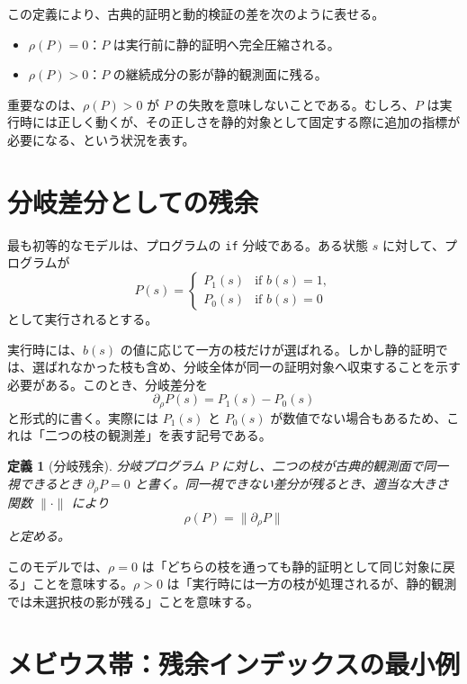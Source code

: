 \documentclass[11pt,a4paper,ja=standard,autodetect-engine]{bxjsarticle}
\newtheorem{definition}{定義}
\begin{document}
この定義により、古典的証明と動的検証の差を次のように表せる。
\begin{itemize}
    \item $\rho(P)=0$：$P$ は実行前に静的証明へ完全圧縮される。
    \item $\rho(P)>0$：$P$ の継続成分の影が静的観測面に残る。
\end{itemize}

重要なのは、$\rho(P)>0$ が $P$ の失敗を意味しないことである。むしろ、$P$ は実行時には正しく動くが、その正しさを静的対象として固定する際に追加の指標が必要になる、という状況を表す。

\section{分岐差分としての残余}

最も初等的なモデルは、プログラムの \texttt{if} 分岐である。ある状態 $s$ に対して、プログラムが
\begin{equation}
    P(s)=
    \begin{cases}
        P_{1}(s) & \text{if } b(s)=1,\\
        P_{0}(s) & \text{if } b(s)=0
    \end{cases}
\end{equation}
として実行されるとする。

実行時には、$b(s)$ の値に応じて一方の枝だけが選ばれる。しかし静的証明では、選ばれなかった枝も含め、分岐全体が同一の証明対象へ収束することを示す必要がある。このとき、分岐差分を
\begin{equation}
    \partial_{\rho}P(s)=P_{1}(s)-P_{0}(s)
\end{equation}
と形式的に書く。実際には $P_{1}(s)$ と $P_{0}(s)$ が数値でない場合もあるため、これは「二つの枝の観測差」を表す記号である。

\begin{definition}[分岐残余]
分岐プログラム $P$ に対し、二つの枝が古典的観測面で同一視できるとき $\partial_{\rho}P=0$ と書く。同一視できない差分が残るとき、適当な大きさ関数 $\|\cdot\|$ により
\begin{equation}
    \rho(P)=\|\partial_{\rho}P\|
\end{equation}
と定める。
\end{definition}

このモデルでは、$\rho=0$ は「どちらの枝を通っても静的証明として同じ対象に戻る」ことを意味する。$\rho>0$ は「実行時には一方の枝が処理されるが、静的観測では未選択枝の影が残る」ことを意味する。

\section{メビウス帯：残余インデックスの最小例}
\end{document}
